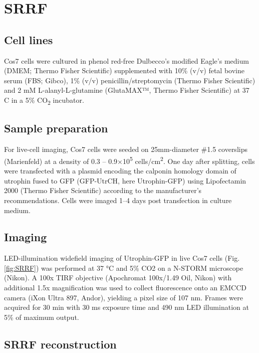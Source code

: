 \section{SRRF}

\subsection{Cell lines}

Cos7 cells were cultured in phenol red-free Dulbecco’s modified Eagle’s medium (DMEM; Thermo Fisher Scientific) supplemented with 10\% (v/v) fetal bovine serum (FBS; Gibco), 1\% (v/v) penicillin/streptomycin (Thermo Fisher Scientific) and 2 mM L-alanyl-L-glutamine (GlutaMAX™, Thermo Fisher Scientific) at 37 \degree C in a 5\% CO\textsubscript{2} incubator.

\subsection{Sample preparation}

For live-cell imaging, Cos7 cells were seeded on 25mm-diameter \#1.5 coverslips (Marienfeld) at a density of 0.3 – 0.9×10\textsuperscript{5} cells/cm\textsuperscript{2}. One day after splitting, cells were transfected with a plasmid encoding the calponin homology domain of utrophin fused to GFP (GFP-UtrCH, here Utrophin-GFP) \cite{burkel2007versatile} using Lipofectamin 2000 (Thermo Fisher Scientific) according to the manufacturer’s recommendations. Cells were imaged 1–4 days post transfection in culture medium.

\subsection{Imaging}

LED-illumination widefield imaging of Utrophin-GFP in live Cos7 cells (Fig. \ref{fig:SRRF}) was performed at 37 °C and 5\% CO2 on a N-STORM microscope (Nikon). A 100x TIRF objective (Apochromat 100x/1.49 Oil, Nikon) with additional 1.5x magnification was used to collect fluorescence onto an EMCCD camera (iXon Ultra 897, Andor), yielding a pixel size of 107 nm. Frames were acquired for 30 min with 30 ms exposure time and 490 nm LED illumination at 5\% of maximum output. 

\subsection{SRRF reconstruction}

